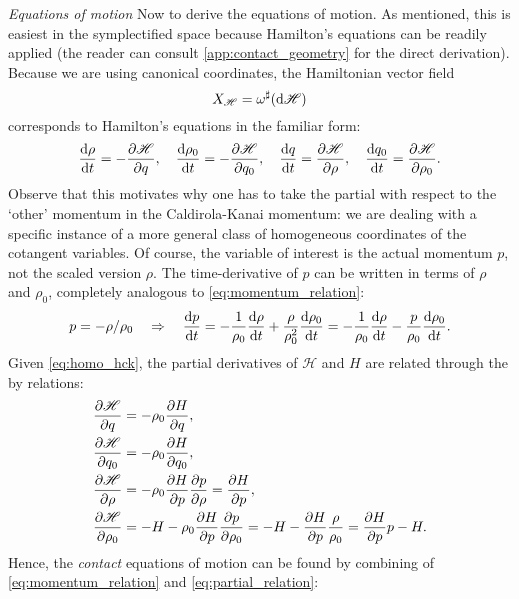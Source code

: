 \emph{Equations of motion} Now to derive the equations of motion. As mentioned, this is easiest in the symplectified space because Hamilton's equations can be readily applied (the reader can consult \cref{app:contact_geometry} for the direct derivation). Because we are using canonical coordinates, the Hamiltonian vector field
\begin{equation}
    X_\mathscr{H} = \omega^\sharp(\dd{\mathscr{H}})
    \label{eq:ham_vf}
\end{equation}
corresponds to Hamilton's equations in the familiar form:
\begin{equation}
    \dv{\rho}{t} = -\pdv{\mathscr{H}}{q},\quad
        \dv{\rho_0}{t} = -\pdv{\mathscr{H}}{q_0},\quad
        \dv{q}{t} = \pdv{\mathscr{H}}{\rho},\quad
        \dv{q_0}{t} = \pdv{\mathscr{H}}{\rho_0}.
\end{equation}
Observe that this motivates why one has to take the partial with respect to the `other' momentum in the Caldirola-Kanai momentum: we are dealing with a specific instance of a more general class of homogeneous coordinates of the cotangent variables. Of course, the variable of interest is the actual momentum $p$, not the scaled version $\rho$. The time-derivative of $p$ can be written in terms of $\rho$ and $\rho_0$, completely analogous to \cref{eq:momentum_relation}:
\begin{equation}
    p = -\rho/\rho_0 \quad\Rightarrow\quad \dv{p}{t} = -\frac{1}{\rho_0}\dv{\rho}{t} + \frac{\rho}{\rho_0^2}\dv{\rho_0}{t} = -\frac{1}{\rho_0}\dv{\rho}{t} - \frac{p}{\rho_0}\dv{\rho_0}{t}. 
    \label{eq:homo_momenta}
\end{equation}
Given \cref{eq:homo_hck}, the partial derivatives of $\mathscr{H}$ and $H$ are related through the by relations: \cite{Arnold1989}
\begin{equation}
    \begin{split}
        \pdv{\mathscr{H}}{q} &= -\rho_0 \pdv{H}{q}, \\
        \pdv{\mathscr{H}}{q_0} &= -\rho_0 \pdv{H}{q_0}, \\
        \pdv{\mathscr{H}}{\rho} &= -\rho_0 \pdv{H}{p}\pdv{p}{\rho} = \pdv{H}{p}, \\
        \pdv{\mathscr{H}}{\rho_0} &= -H - \rho_0 \pdv{H}{p}\pdv{p}{\rho_0} = -H - \pdv{H}{p}\frac{\rho}{\rho_0} = \pdv{H}{p}p - H.\\
    \end{split}
    \label{eq:partial_relation}
\end{equation}
Hence, the \emph{contact} equations of motion can be found by combining of \cref{eq:momentum_relation} and \cref{eq:partial_relation}:

